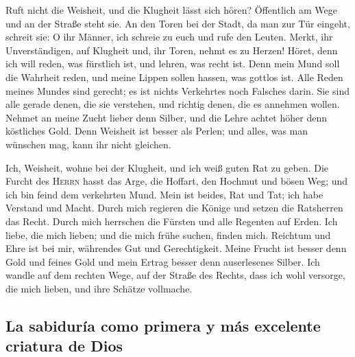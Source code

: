  Ruft nicht die Weisheit, und die Klugheit lässt sich
hören?  Öffentlich am Wege und an der Straße steht sie.
 An den Toren bei der Stadt, da man zur Tür eingeht,
schreit sie:  O ihr Männer, ich schreie zu euch und rufe
den Leuten.  Merkt, ihr Unverständigen, auf Klugheit und,
ihr Toren, nehmt es zu Herzen!  Höret, denn ich will
reden, was fürstlich ist, und lehren, was recht ist.  Denn
mein Mund soll die Wahrheit reden, und meine Lippen sollen hassen, was
gottlos ist.  Alle Reden meines Mundes sind gerecht; es
ist nichts Verkehrtes noch Falsches darin.  Sie sind alle
gerade denen, die sie verstehen, und richtig denen, die es annehmen
wollen.  Nehmet an meine Zucht lieber denn Silber, und
die Lehre achtet höher denn köstliches Gold.  Denn
Weisheit ist besser als Perlen; und alles, was man wünschen mag, kann
ihr nicht gleichen.

 Ich, Weisheit, wohne bei der Klugheit, und ich weiß
guten Rat zu geben.  Die Furcht des \textsc{Herrn} hasst
das Arge, die Hoffart, den Hochmut und bösen Weg; und ich bin feind dem
verkehrten Mund.  Mein ist beides, Rat und Tat; ich habe
Verstand und Macht.  Durch mich regieren die Könige und
setzen die Ratsherren das Recht.  Durch mich herrschen
die Fürsten und alle Regenten auf Erden.  Ich liebe, die
mich lieben; und die mich frühe suchen, finden mich. 
Reichtum und Ehre ist bei mir, währendes Gut und Gerechtigkeit.
 Meine Frucht ist besser denn Gold und feines Gold und
mein Ertrag besser denn auserlesenes Silber.  Ich wandle
auf dem rechten Wege, auf der Straße des Rechts,  dass
ich wohl versorge, die mich lieben, und ihre Schätze vollmache.

\hypertarget{la-sabiduruxeda-como-primera-y-muxe1s-excelente-criatura-de-dios}{%
\subsection{La sabiduría como primera y más excelente criatura de
Dios}\label{la-sabiduruxeda-como-primera-y-muxe1s-excelente-criatura-de-dios}}

